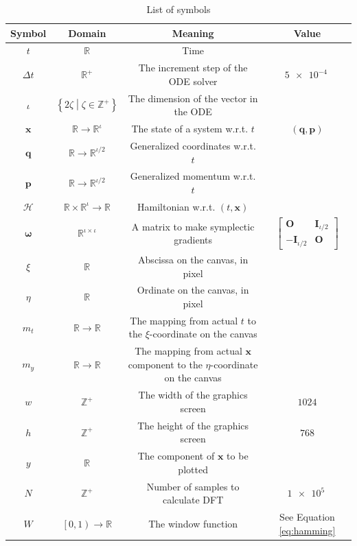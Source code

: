 \documentclass[12pt]{article}
\begin{document}
\begin{table}[h]
  \caption{List of symbols}
  \label{tab:symbols}
  \centering
  \begin{tabular}{cccc}
    Symbol & Domain & Meaning & Value\\
    \hline
    $t$ & $\mathbb R$ & Time\\
    $\Delta t$ & $\mathbb R^+$ & The increment step of the ODE solver & $\SI{5e-4}{}$\\
    $\iota$ & $\left\{2\zeta\middle|\zeta\in\mathbb Z^+\right\}$ & The dimension of the vector in the ODE\\
    $\mathbf x$ & $\mathbb R\rightarrow\mathbb R^\iota$ & The state of a system w.r.t. $t$ & $\left(\mathbf q,\mathbf p\right)$\\
    $\mathbf q$ & $\mathbb R\rightarrow\mathbb R^{\iota/2}$ & Generalized coordinates w.r.t. $t$\\
    $\mathbf p$ & $\mathbb R\rightarrow\mathbb R^{\iota/2}$ & Generalized momentum w.r.t. $t$\\
    $\mathcal H$ & $\mathbb R\times\mathbb R^\iota\rightarrow\mathbb R$ & Hamiltonian w.r.t. $\left(t,\mathbf x\right)$\\
    $\boldsymbol\omega$ & $\mathbb R^{\iota\times\iota}$ & A matrix to make symplectic gradients & $\left[\begin{matrix}
      \mathbf O & \mathbf I_{\iota/2}\\
      -\mathbf I_{\iota/2} & \mathbf O
    \end{matrix}\right]$\\
    $\xi$ & $\mathbb R$ & Abscissa on the canvas, in pixel\\
    $\eta$ & $\mathbb R$ & Ordinate on the canvas, in pixel\\
    $m_t$ & $\mathbb R\rightarrow\mathbb R$ & \makecell{The mapping from actual $t$\\to the $\xi$-coordinate on the canvas}\\
    $m_y$ & $\mathbb R\rightarrow\mathbb R$ & \makecell{The mapping from actual $\mathbf x$ component\\to the $\eta$-coordinate on the canvas}\\
    $w$ & $\mathbb Z^+$ & The width of the graphics screen & $1024$\\
    $h$ & $\mathbb Z^+$ & The height of the graphics screen & $768$\\
    $y$ & $\mathbb R$ & The component of $\mathbf x$ to be plotted\\
    $N$ & $\mathbb Z^+$ & Number of samples to calculate DFT & $\SI{1e5}{}$\\
    $W$ & $\left[0,1\right)\rightarrow\mathbb R$ & The window function & See Equation \ref{eq:hamming}
  \end{tabular}
\end{table}
\end{document}
